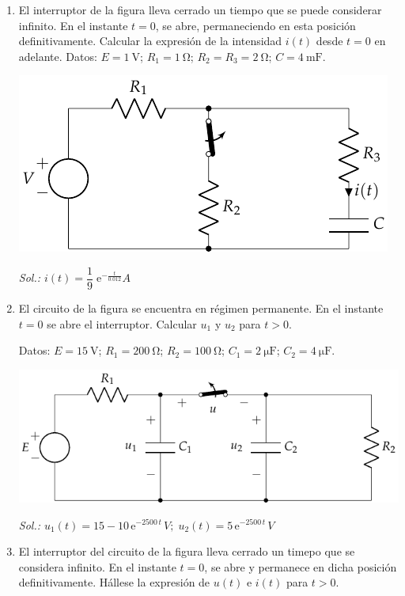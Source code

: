 \begin{enumerate}
\item El interruptor de la figura lleva cerrado un tiempo que se puede
  considerar infinito. En el instante $t=0$, se abre, permaneciendo en
  esta posición definitivamente. Calcular la expresión de la
  intensidad $i(t)$ desde $t=0$ en adelante.  Datos:
  $E = \qty{1}{\volt}$; $R_1 = \qty{1}{\ohm}$;
  $R_2 = R_3 = \qty{2}{\ohm}$; $C = \qty{4}{\milli\farad}$.

  \begin{center}
    \includegraphics{../figs/BT4_01.pdf}
  \end{center}

  \emph{Sol.: $i(t)=\dfrac{1}{9}\; \mathrm{e}^{-\frac{t}{0.012}} A$}
  
\item El circuito de la figura se encuentra en régimen permanente. En
  el instante $t=0$ se abre el interruptor. Calcular $u_1$ y $u_2$
  para $t>0$.

  Datos: $E = \qty{15}{\volt}$; $R_1 = \qty{200}{\ohm}$;
  $R_2 = \qty{100}{\ohm}$; $C_1 = \qty{2}{\micro\farad}$;
  $C_2 = \qty{4}{\micro\farad}$.

  \begin{center}
    \includegraphics{../figs/BT4_02.pdf}
  \end{center}

  \emph{Sol.:
    $u_1(t)=15-10\,\mathrm{e}^{-2500\,t}\,V;\;
    u_2(t)=5\,\mathrm{e}^{-2500\,t}\,V$}
  
\item El interruptor del circuito de la figura lleva cerrado un timepo
  que se considera infinito. En el instante $t=0$, se abre y permanece
  en dicha posición definitivamente. Hállese la expresión de $u(t)$ e
  $i(t)$ para $t>0$.


\end{enumerate}
